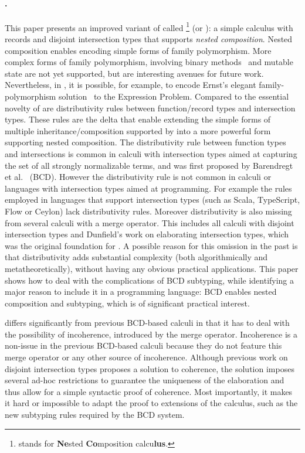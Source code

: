 \paragraph{\name.}
This paper presents an improved variant of \oname called
\name\footnote{\name stands for \textbf{Ne}sted \textbf{Co}mposition
  calcu\textbf{lus}.} (or \namee): a simple calculus with records and
disjoint intersection types that supports \emph{nested composition}. Nested composition enables
encoding simple forms of family polymorphism. More complex forms of
family polymorphism, involving binary methods~\citep{bruce1995binary} and mutable state are
not yet supported, but are interesting avenues for future work.
Nevertheless, in \name, it is
possible, for example, to encode Ernst's elegant family-polymorphism solution~\citep{Ernst_2001} to
the Expression Problem. 
Compared to \oname the essential novelty of \name are
distributivity rules between function/record types and intersection
types. These rules are the delta that enable extending the simple
forms of multiple inheritance/composition supported by \oname into a
more powerful form supporting nested composition. The distributivity
rule between function types and intersections is
common in calculi with intersection types aimed at capturing the set
of all strongly normalizable terms, and was first proposed by
Barendregt et al.~\citep{Barendregt_1983} (BCD). However the
distributivity rule is not common in calculi or languages with intersection types
aimed at programming. For example the rules employed in languages that
support intersection types (such as Scala, TypeScript, Flow or Ceylon)
lack distributivity rules. Moreover distributivity is also missing from
several calculi with a merge operator. This includes all calculi with
disjoint intersection types and Dunfield's work on elaborating
intersection types, which was the original foundation for \oname.
A possible reason for this omission in the past is that distributivity adds
substantial complexity (both algorithmically and metatheoretically), without having any obvious practical
applications. 
This paper shows how to deal with the complications of BCD subtyping, while
identifying a major reason to include it in a programming
language: BCD enables nested composition and subtyping, which is of
significant practical interest.


\name differs significantly from previous BCD-based calculi in that it has to
deal with the possibility of incoherence, introduced by the merge operator. Incoherence
is a non-issue in the previous BCD-based calculi because they do not feature
this merge operator or any other source of incoherence.
Although previous work on disjoint intersection types
proposes a solution to coherence, the solution imposes several ad-hoc restrictions
to guarantee the uniqueness of the elaboration and thus allow for a simple
syntactic proof of coherence. Most
importantly, it makes it hard or impossible to adapt the proof to extensions of
the calculus, such as the new subtyping rules required by the BCD system.

